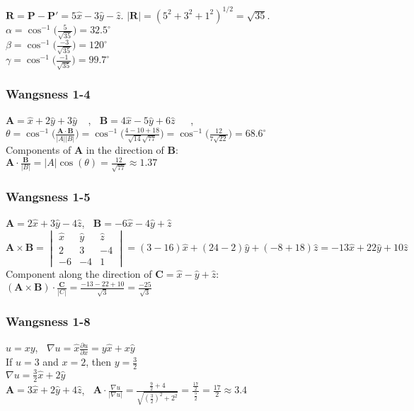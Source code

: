 \documentclass[oneside]{book}
\theoremstyle{definition}
\newcommand*\B[1]{\mathbf{#1}}
\begin{document}
$\B{R} = \B{P}-\B{P'} = 5\hat{x} - 3\hat{y} - \hat{z}$. $|\B{R}| = (5^2+3^2+1^2)^{1/2} = \sqrt{35}$.\\
$\alpha = \cos^{-1}\big(\frac{5}{\sqrt{35}}\big) = 32.5^{\circ}$\\
$\beta = \cos^{-1}\big(\frac{-3}{\sqrt{35}}\big) = 120^{\circ}$\\
$\gamma = \cos^{-1}\big(\frac{-1}{\sqrt{35}}\big) = 99.7^{\circ}$

\subsubsection{Wangsness 1-4}

$\B{A} = \hat{x} + 2\hat{y} + 3\hat{y}$ $\ $  $\ $, $\ $  $\B{B} = 4\hat{x} - 5\hat{y} + 6\hat{z}$\ $\ $ \ ,$\ $ $\ $ $\theta = \cos^{-1}\big(\frac{\B{A}\cdot\B{B}}{|A||B|}\big) = \cos^{-1}\big(\frac{4-10+18}{\sqrt{14}\sqrt{77}}\big)=\cos^{-1}\big(\frac{12}{7\sqrt{22}}\big)=68.6^{\circ}$ \\
Components of $\B{A}$ in the direction of $\B{B}$:\\
$\B{A}\cdot \frac{\B{B}}{|B|} = |A|\cos(\theta) = \frac{12}{\sqrt{77}} \approx 1.37$

\subsubsection{Wangsness 1-5}

$\B{A} = 2\hat{x} + 3\hat{y} - 4\hat{z}$, $\ $ $\B{B} = -6\hat{x} - 4\hat{y} + \hat{z}$\\
$\B{A}\times \B{B} = \begin{vmatrix} \hat{x} & \hat{y} & \hat{z} \\ 2 & 3 & -4 \\ -6 & -4 & 1 \end{vmatrix} = (3-16)\hat{x} + (24-2)\hat{y} + (-8+18)\hat{z} = -13\hat{x} + 22\hat{y} + 10\hat{z}$ \\
Component along the direction of $\B{C} = \hat{x} - \hat{y} + \hat{z}$:\\
$(\B{A}\times \B{B})\cdot \frac{\B{C}}{|C|} = \frac{-13-22+10}{\sqrt{3}}=\frac{-25}{\sqrt{3}}$

\subsubsection{Wangsness 1-8}

$u = xy$, $\ $ $\nabla u = \hat{x}\frac{\partial u}{\partial x}= y\hat{x} + x\hat{y}$ \\
If $u = 3$ and $x=2$, then $y = \frac{3}{2}$\\
$\nabla u = \frac{3}{2}\hat{x} + 2\hat{y}$ \\
$\B{A} = 3\hat{x} + 2\hat{y} + 4\hat{z}$, $\ $ $\B{A}\cdot \frac{\nabla u}{|\nabla u|} = \frac{\frac{9}{2}+4}{\sqrt{(\frac{3}{2})^2 + 2^2}} = \frac{\frac{17}{2}}{\frac{5}{2}} = \frac{17}{2}\approx 3.4$
\end{document}
